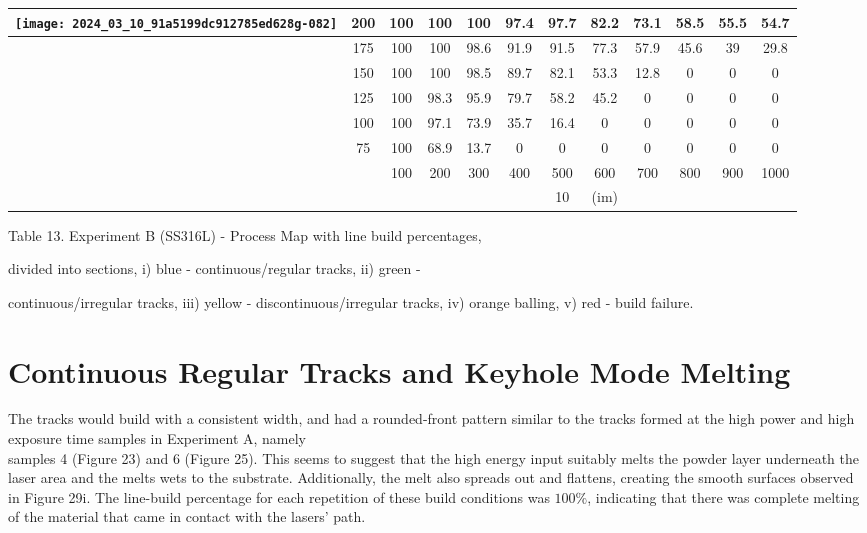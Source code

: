 \documentclass[10pt]{article}
\begin{document}
\begin{center}
\begin{tabular}{|c|c|c|c|c|c|c|c|c|c|c|c|}
\hline
\multirow{6}{*}{\texttt{[image: 2024\_03\_10\_91a5199dc912785ed628g-082]}
} & 200 & 100 & 100 & 100 & 97.4 & 97.7 & 82.2 & 73.1 & 58.5 & 55.5 & 54.7 \\
\hline
 & 175 & 100 & 100 & 98.6 & 91.9 & 91.5 & 77.3 & 57.9 & 45.6 & 39 & 29.8 \\
\hline
 & 150 & 100 & 100 & 98.5 & 89.7 & 82.1 & 53.3 & 12.8 & 0 & 0 & 0 \\
\hline
 & 125 & 100 & 98.3 & 95.9 & 79.7 & 58.2 & 45.2 & 0 & 0 & 0 & 0 \\
\hline
 & 100 & 100 & 97.1 & 73.9 & 35.7 & 16.4 & 0 & 0 & 0 & 0 & 0 \\
\hline
 & 75 & 100 & 68.9 & 13.7 & 0 & 0 & 0 & 0 & 0 & 0 & 0 \\
\hline
 &  & 100 & 200 & 300 & 400 & 500 & 600 & 700 & 800 & 900 & 1000 \\
\hline
 &  &  &  &  &  & 10 & (im) &  &  &  &  \\
\hline
\end{tabular}
\end{center}

Table 13. Experiment B (SS316L) - Process Map with line build percentages,

divided into sections, i) blue - continuous/regular tracks, ii) green -

continuous/irregular tracks, iii) yellow - discontinuous/irregular tracks, iv) orange balling, v) red - build failure.

\section*{Continuous Regular Tracks and Keyhole Mode Melting}
The tracks would build with a consistent width, and had a rounded-front pattern similar to the tracks formed at the high power and high exposure time samples in Experiment A, namely\\
samples 4 (Figure 23) and 6 (Figure 25). This seems to suggest that the high energy input suitably melts the powder layer underneath the laser area and the melts wets to the substrate. Additionally, the melt also spreads out and flattens, creating the smooth surfaces observed in Figure 29i. The line-build percentage for each repetition of these build conditions was $100 \%$, indicating that there was complete melting of the material that came in contact with the lasers' path.
\end{document}
